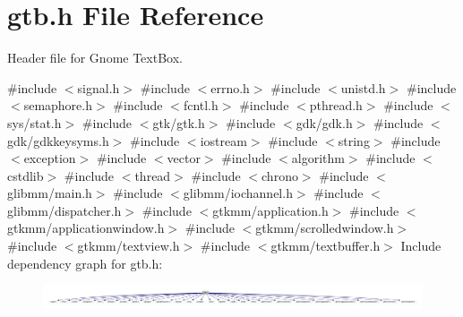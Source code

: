 \hypertarget{a00005}{}\section{gtb.\+h File Reference}
\label{a00005}


Header file for Gnome Text\+Box.  


{\ttfamily \#include $<$signal.\+h$>$}\newline
{\ttfamily \#include $<$errno.\+h$>$}\newline
{\ttfamily \#include $<$unistd.\+h$>$}\newline
{\ttfamily \#include $<$semaphore.\+h$>$}\newline
{\ttfamily \#include $<$fcntl.\+h$>$}\newline
{\ttfamily \#include $<$pthread.\+h$>$}\newline
{\ttfamily \#include $<$sys/stat.\+h$>$}\newline
{\ttfamily \#include $<$gtk/gtk.\+h$>$}\newline
{\ttfamily \#include $<$gdk/gdk.\+h$>$}\newline
{\ttfamily \#include $<$gdk/gdkkeysyms.\+h$>$}\newline
{\ttfamily \#include $<$iostream$>$}\newline
{\ttfamily \#include $<$string$>$}\newline
{\ttfamily \#include $<$exception$>$}\newline
{\ttfamily \#include $<$vector$>$}\newline
{\ttfamily \#include $<$algorithm$>$}\newline
{\ttfamily \#include $<$cstdlib$>$}\newline
{\ttfamily \#include $<$thread$>$}\newline
{\ttfamily \#include $<$chrono$>$}\newline
{\ttfamily \#include $<$glibmm/main.\+h$>$}\newline
{\ttfamily \#include $<$glibmm/iochannel.\+h$>$}\newline
{\ttfamily \#include $<$glibmm/dispatcher.\+h$>$}\newline
{\ttfamily \#include $<$gtkmm/application.\+h$>$}\newline
{\ttfamily \#include $<$gtkmm/applicationwindow.\+h$>$}\newline
{\ttfamily \#include $<$gtkmm/scrolledwindow.\+h$>$}\newline
{\ttfamily \#include $<$gtkmm/textview.\+h$>$}\newline
{\ttfamily \#include $<$gtkmm/textbuffer.\+h$>$}\newline
Include dependency graph for gtb.\+h\+:\nopagebreak
\begin{figure}[H]
\begin{center}
\leavevmode
\includegraphics[width=350pt]{a00006}
\end{center}
\end{figure}
